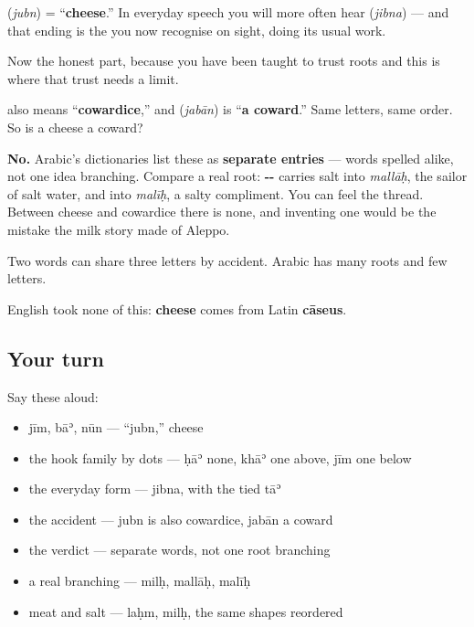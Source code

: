 \begin{cousinweb}
\textbf{} (\emph{jubn}) = \textquotedblleft{}\textbf{cheese}.\textquotedblright{} In everyday speech you will more often hear \textbf{} (\emph{jibna}) — and that ending is the \textbf{} you now recognise on sight, doing its usual work.

Now the honest part, because you have been taught to trust roots and this is where that trust needs a limit.

\textbf{} also means \textquotedblleft{}\textbf{cowardice},\textquotedblright{} and \textbf{} (\emph{jabān}) is \textquotedblleft{}\textbf{a coward}.\textquotedblright{} Same letters, same order. So is a cheese a coward?

\textbf{No.} Arabic's dictionaries list these as \textbf{separate entries} — words spelled alike, not one idea branching. Compare a real root: \textbf{--} carries salt into \emph{mallāḥ}, the sailor of salt water, and into \emph{malīḥ}, a salty compliment. You can feel the thread. Between cheese and cowardice there is none, and inventing one would be the mistake the milk story made of Aleppo.

Two words can share three letters by accident. Arabic has many roots and few letters.

English took none of this: \textbf{cheese} comes from Latin \textbf{cāseus}.
\end{cousinweb}

\subsection*{Your turn}
Say these aloud:

\begin{itemize}
\raggedright
  \item jīm, bāʾ, nūn — \textquotedblleft{}jubn,\textquotedblright{} cheese
  \item the hook family by dots — ḥāʾ none, khāʾ one above, jīm one below
  \item the everyday form — jibna, with the tied tāʾ
  \item the accident — jubn is also cowardice, jabān a coward
  \item the verdict — separate words, not one root branching
  \item a real branching — milḥ, mallāḥ, malīḥ
  \item meat and salt — laḥm, milḥ, the same shapes reordered
\end{itemize}

